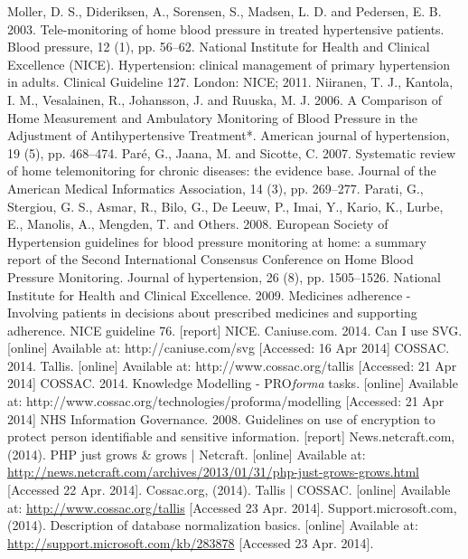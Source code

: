 \documentclass[11pt]{article}
\begin{document}
\begin{thebibliography}{40}
\begin{singlespace}
Moller, D. S., Dideriksen, A., Sorensen, S., Madsen, L. D. and Pedersen, E. B. 2003. Tele-monitoring of home blood pressure in treated hypertensive patients. Blood pressure, 12 (1), pp. 56--62.
National Institute for Health and Clinical Excellence (NICE). Hypertension: clinical management of primary hypertension in adults. Clinical Guideline 127. London: NICE; 2011.
Niiranen, T. J., Kantola, I. M., Vesalainen, R., Johansson, J. and Ruuska, M. J. 2006. A Comparison of Home Measurement and Ambulatory Monitoring of Blood Pressure in the Adjustment of Antihypertensive Treatment*. American journal of hypertension, 19 (5), pp. 468--474.
Par\'e, G., Jaana, M. and Sicotte, C. 2007. Systematic review of home telemonitoring for chronic diseases: the evidence base. Journal of the American Medical Informatics Association, 14 (3), pp. 269--277.
Parati, G., Stergiou, G. S., Asmar, R., Bilo, G., De Leeuw, P., Imai, Y., Kario, K., Lurbe, E., Manolis, A., Mengden, T. and Others. 2008. European Society of Hypertension guidelines for blood pressure monitoring at home: a summary report of the Second International Consensus Conference on Home Blood Pressure Monitoring. Journal of hypertension, 26 (8), pp. 1505--1526.
National Institute for Health and Clinical Excellence. 2009. Medicines adherence - Involving patients in decisions about prescribed medicines and supporting adherence. NICE guideline 76. [report] NICE.
Caniuse.com. 2014. Can I use SVG. [online] Available at: http://caniuse.com/svg [Accessed: 16 Apr 2014]
COSSAC. 2014. Tallis. [online] Available at: http://www.cossac.org/tallis [Accessed: 21 Apr 2014]
COSSAC. 2014. Knowledge Modelling - PRO\textit{forma} tasks. [online] Available at: http://www.cossac.org/technologies/proforma/modelling [Accessed: 21 Apr 2014]
NHS Information Governance. 2008. Guidelines on use of encryption to protect person identifiable and sensitive information. [report]
News.netcraft.com, (2014). PHP just grows \& grows | Netcraft. [online] Available at: \url{http://news.netcraft.com/archives/2013/01/31/php-just-grows-grows.html} [Accessed 22 Apr. 2014].
Cossac.org, (2014). Tallis | COSSAC. [online] Available at: \url{http://www.cossac.org/tallis} [Accessed 23 Apr. 2014].
Support.microsoft.com, (2014). Description of database normalization basics. [online] Available at: \url{http://support.microsoft.com/kb/283878} [Accessed 23 Apr. 2014].

\end{singlespace}
\end{thebibliography}
\end{document}
